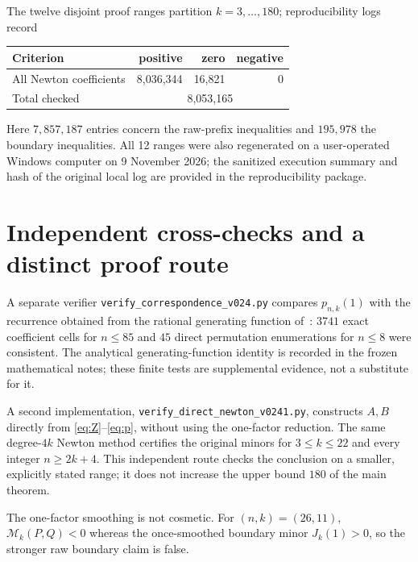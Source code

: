 \documentclass[11pt,a4paper]{article}
\newcommand{\M}{\mathcal M}
\begin{document}
The twelve disjoint proof ranges partition $k=3,\ldots,180$;
reproducibility logs record
\begin{center}
\begin{tabular}{lrrr}\toprule
Criterion & positive & zero & negative\\\midrule
All Newton coefficients & 8,036,344 & 16,821 & 0\\
Total checked & \multicolumn{3}{c}{8,053,165}\\\bottomrule
\end{tabular}
\end{center}
Here $7,857,187$ entries concern the raw-prefix inequalities and
$195,978$ the boundary inequalities. All 12 ranges were also
regenerated on a user-operated Windows computer on 9 November 2026;
the sanitized execution summary and hash of the original local log are
provided in the reproducibility package.

\section{Independent cross-checks and a distinct proof route}\label{sec:crosschecks}
A separate verifier \texttt{verify\_correspondence\_v024.py} compares
$p_{n,k}(1)$ with the recurrence obtained from the rational generating
function of~\cite[Thm.~3.5]{ERZ}: $3741$ exact coefficient cells
for $n\le85$ and $45$ direct permutation enumerations for $n\le8$
were consistent. The analytical generating-function identity is
recorded in the frozen mathematical notes; these finite tests are
supplemental evidence, not a substitute for it.

A second implementation, \texttt{verify\_direct\_newton\_v0241.py},
constructs $A,B$ directly from \eqref{eq:Z}--\eqref{eq:p}, without using
the one-factor reduction. The same degree-$4k$ Newton method
certifies the original minors for $3\le k\le22$ and every integer
$n\ge2k+4$. This independent route checks the conclusion on a
smaller, explicitly stated range; it does not increase the upper bound
$180$ of the main theorem.

The one-factor smoothing is not cosmetic. For $(n,k)=(26,11)$,
$\M_k(P,Q)<0$ whereas the once-smoothed boundary minor
$J_k(1)>0$, so the stronger raw boundary claim is false.
\end{document}
